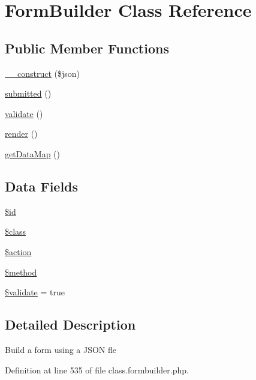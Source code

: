 \hypertarget{class_form_builder}{\section{Form\-Builder Class Reference}
\label{class_form_builder}
}
\subsection*{Public Member Functions}
\begin{DoxyCompactItemize}
\item 
\hyperlink{class_form_builder_a4c42917fb3b52f327f9bbadf0a99b15c}{\-\_\-\-\_\-construct} (\$json)
\item 
\hyperlink{class_form_builder_a335cdb2aa63a2c49551a24d62dd28742}{submitted} ()
\item 
\hyperlink{class_form_builder_a184909dab34698899937d810a9f5d393}{validate} ()
\item 
\hyperlink{class_form_builder_afde88292c44dc59faf017738dae6dffb}{render} ()
\item 
\hyperlink{class_form_builder_a0828e6a5b4a68fc77042472bc886ae15}{get\-Data\-Map} ()
\end{DoxyCompactItemize}
\subsection*{Data Fields}
\begin{DoxyCompactItemize}
\item 
\hyperlink{class_form_builder_ae97941710d863131c700f069b109991e}{\$id}
\item 
\hyperlink{class_form_builder_a252ba022809910ea710a068fc1bab657}{\$class}
\item 
\hyperlink{class_form_builder_aa698a3e72116e8e778be0e95d908ee30}{\$action}
\item 
\hyperlink{class_form_builder_a12661b2fc0f57f97e30a1620889ce9c6}{\$method}
\item 
\hyperlink{class_form_builder_a320b75b46e1832c327d9d47b4cea9e7d}{\$validate} = true
\end{DoxyCompactItemize}


\subsection{Detailed Description}
Build a form using a J\-S\-O\-N fle 

Definition at line 535 of file class.\-formbuilder.\-php.



